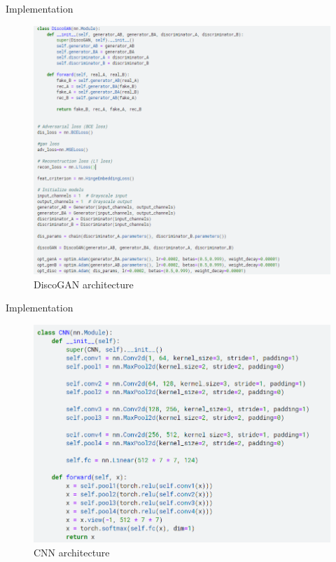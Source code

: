 \documentclass[xcolor=dvipsnames]{beamer}
\begin{document}
\begin{frame}{Implementation}
\begin{figure}
    \centering
    \includegraphics[scale = 0.35]{ppt/DiscoGAN.png}
    \caption{DiscoGAN architecture}
    \label{fig:enter-label}
\end{figure}
\end{frame}

\begin{frame}{Implementation}
\begin{figure}
    \centering
    \includegraphics[scale = 0.40]{ppt/CNN.png}
    \caption{CNN architecture}
    \label{fig:enter-label}
\end{figure}
\end{frame}
\end{document}
